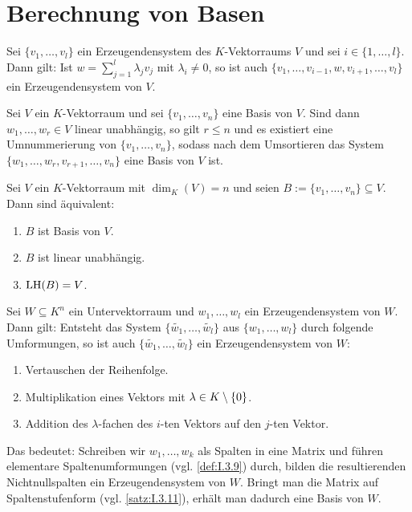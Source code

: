 \section{Berechnung von Basen}

\begin{lemma}[Austauschlemma]
	\label{lemma:I.9.1}
	Sei $\{v_1,\dots,v_l\}$ ein Erzeugendensystem des $K$-Vektorraums $V$ und sei $i \in \{1,\dots,l\}$.
	Dann gilt:
	Ist $w = \sum_{j=1}^{l} \lambda_j v_j$ mit $\lambda_i \neq 0$, so ist auch $\{v_1,\dots,v_{i-1},w,v_{i+1},\dots,v_l\}$ ein Erzeugendensystem von $V$.
\end{lemma}

\begin{satz}[Basisergänzungssatz]
	\label{satz:I.9.2}
	Sei $V$ ein $K$-Vektorraum und sei $\{v_1,\dots,v_n\}$ eine Basis von $V$.
	Sind dann $w_1,\dots,w_r \in V$ linear unabhängig, so gilt $r \leq n$ und es existiert eine Umnummerierung von $\{v_1,\dots,v_n\}$, sodass nach dem Umsortieren das System $\{w_1,\dots,w_r,v_{r+1},\dots,v_n\}$ eine Basis von $V$ ist.
\end{satz}

\begin{satz}
	\label{satz:I.9.3}
	Sei $V$ ein $K$-Vektorraum mit $\dim_K(V) = n$ und seien $B := \{v_1,\dots,v_n\} \subseteq V$.
	Dann sind äquivalent:
	\begin{enumerate}[(1)]
		\item $B$ ist Basis von $V$.
		\item $B$ ist linear unabhängig.
		\item $\operatorname{LH}(B) = V$.
	\end{enumerate}
\end{satz}

\begin{satz}
	\label{satz:I.9.4}
	Sei $W \subseteq K^n$ ein Untervektorraum und $w_1,\dots,w_l$ ein Erzeugendensystem von $W$.
	Dann gilt:
	Entsteht das System $\{\widetilde{w_1},\dots,\widetilde{w_l}\}$ aus $\{w_1,\dots,w_l\}$ durch folgende Umformungen, so ist auch $\{\widetilde{w_1},\dots,\widetilde{w_l}\}$ ein Erzeugendensystem von $W$:
	\begin{enumerate}[(1)]
		\item Vertauschen der Reihenfolge.
		\item Multiplikation eines Vektors mit $\lambda \in K \setminus \{0\}$.
		\item Addition des $\lambda$-fachen des $i$-ten Vektors auf den $j$-ten Vektor.
	\end{enumerate}
	Das bedeutet:
	Schreiben wir $w_1,\dots,w_k$ als Spalten in eine Matrix und führen elementare Spaltenumformungen (vgl. \autoref{def:I.3.9}) durch, bilden die resultierenden Nichtnullspalten ein Erzeugendensystem von $W$.
	Bringt man die Matrix auf Spaltenstufenform (vgl. \autoref{satz:I.3.11}), erhält man dadurch eine Basis von $W$.
\end{satz}

